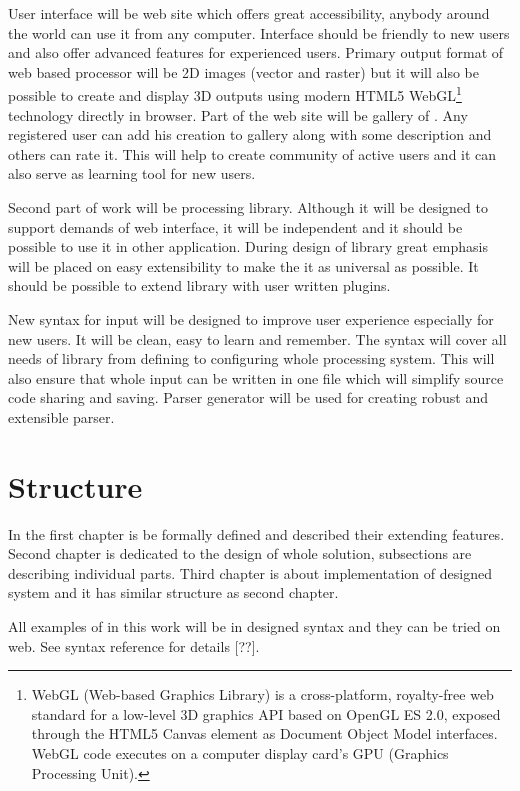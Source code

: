 User interface will be web site which offers great accessibility, anybody around the world can use it from any computer.
Interface should be friendly to new users and also offer advanced features for experienced users.
Primary output format of web based \lsystem processor will be 2D images (vector and raster) but it will also be possible to create and display 3D outputs using modern HTML5 WebGL\footnote{
	WebGL (Web-based Graphics Library) is a cross-platform, royalty-free web standard for a low-level 3D graphics API based on OpenGL ES 2.0, exposed through the HTML5 Canvas element as Document Object Model interfaces.
	WebGL code executes on a computer display card's GPU (Graphics Processing Unit).} technology directly in browser.
Part of the web site will be gallery of \lsystems.
Any registered user can add his creation to gallery along with some description and others can rate it.
This will help to create community of active users and it can also serve as learning tool for new users.

Second part of work will be \lsystem processing library.
Although it will be designed to support demands of web interface, it will be independent and it should be possible to use it in other application.
During design of library great emphasis will be placed on easy extensibility to make the it as universal as possible.
It should be possible to extend library with user written plugins.

New syntax for input will be designed to improve user experience especially for new users.
It will be clean, easy to learn and remember.
The syntax will cover all needs of library from defining \lsystems to configuring whole processing system.
This will also ensure that whole input can be written in one file which will simplify source code sharing and saving.
Parser generator will be used for creating robust and extensible parser.


\section*{Structure}

In the first chapter is be formally defined \lsystems and described their extending features.
Second chapter is dedicated to the design of whole solution, subsections are describing individual parts.
Third chapter is about implementation of designed system and it has similar structure as second chapter.


All examples of \lsystems in this work will be in designed syntax and they can be tried on web.
See syntax reference for details [??].































